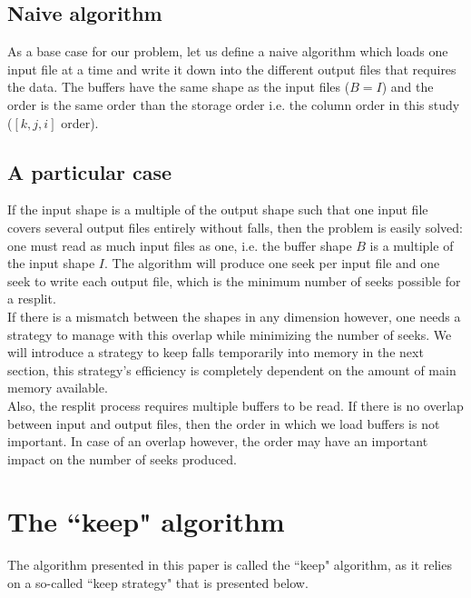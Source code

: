 \documentclass[conference]{IEEEtran}
\begin{document}
\subsection{Naive algorithm}

As a base case for our problem, let us define a naive algorithm which loads one input file at a time and write it down into the different output files that requires the data.
The buffers have the same shape as the input files ($B=I$) and the order is the same order than the storage order i.e. the column order in this study ($[k, j, i]$ order).

\subsection{A particular case}

If the input shape is a multiple of the output shape such that one input file covers several output files entirely without falls, then the problem is easily solved: one must read as much input files as one, i.e. the buffer shape $B$ is a multiple of the input shape $I$.
The algorithm will produce one seek per input file and one seek to write each output file, which is the minimum number of seeks possible for a resplit.\\

If there is a mismatch between the shapes in any dimension however, one needs a strategy to manage with this overlap while minimizing the number of seeks.
We will introduce a strategy to keep falls temporarily into memory in the next section, this strategy's efficiency is completely dependent on the amount of main memory available. \\

Also, the resplit process requires multiple buffers to be read.
If there is no overlap between input and output files, then the order in which we load buffers is not important.
In case of an overlap however, the order may have an important impact on the number of seeks produced.

\section*{The ``keep" algorithm}
The algorithm presented in this paper is called the ``keep" algorithm, as it relies on a so-called ``keep strategy" that is presented below.
\end{document}
